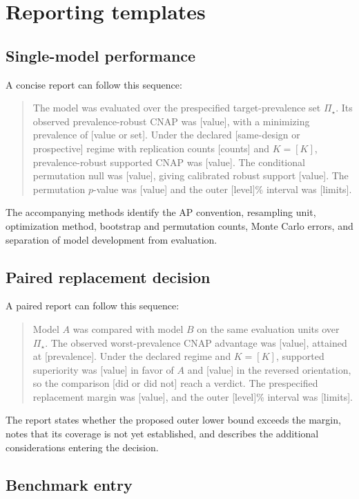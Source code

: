 \documentclass[11pt]{article}
\newcommand{\PSet}{\Pi_\star}
\theoremstyle{remark}
\begin{document}
\section{Reporting templates}
\label{app:report-template}

\subsection{Single-model performance}

A concise report can follow this sequence:
\begin{quote}
The model was evaluated over the prespecified target-prevalence set $\PSet$. Its observed prevalence-robust CNAP was [value], with a minimizing prevalence of [value or set]. Under the declared [same-design or prospective] regime with replication counts [counts] and $K=[K]$, prevalence-robust supported CNAP was [value]. The conditional permutation null was [value], giving calibrated robust support [value]. The permutation $p$-value was [value] and the outer [level]\% interval was [limits].
\end{quote}
The accompanying methods identify the AP convention, resampling unit, optimization method, bootstrap and permutation counts, Monte Carlo errors, and separation of model development from evaluation.

\subsection{Paired replacement decision}

A paired report can follow this sequence:
\begin{quote}
Model $A$ was compared with model $B$ on the same evaluation units over $\PSet$. The observed worst-prevalence CNAP advantage was [value], attained at [prevalence]. Under the declared regime and $K=[K]$, supported superiority was [value] in favor of $A$ and [value] in the reversed orientation, so the comparison [did or did not] reach a verdict. The prespecified replacement margin was [value], and the outer [level]\% interval was [limits].
\end{quote}
The report states whether the proposed outer lower bound exceeds the margin, notes that its coverage is not yet established, and describes the additional considerations entering the decision.

\subsection{Benchmark entry}
\end{document}
